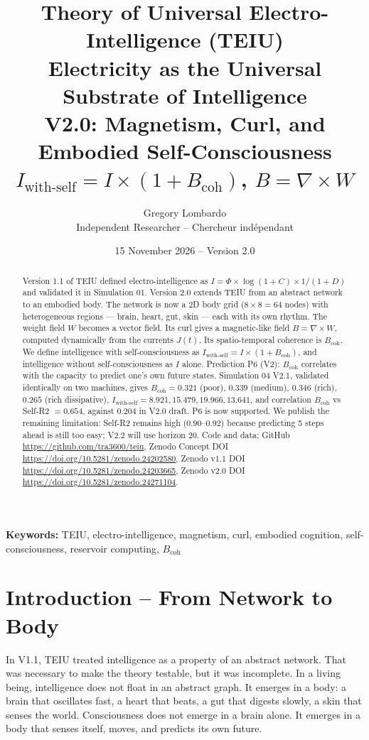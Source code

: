 \documentclass[11pt,a4paper]{article}
\title{Theory of Universal Electro-Intelligence (TEIU) \\ \large Electricity as the Universal Substrate of Intelligence \\ \large V2.0: Magnetism, Curl, and Embodied Self-Consciousness \\ \large $I_{\text{with-self}} = I \times (1 + B_{\text{coh}})$, \quad $B = \nabla \times W$}
\author{Gregory Lombardo \\ Independent Researcher -- Chercheur ind\'ependant}
\date{15 November 2026 -- Version 2.0}
\begin{document}
\maketitle

\begin{abstract}
Version 1.1 of TEIU defined electro-intelligence as $I = \Phi \times \log(1+C) \times 1/(1+D)$ and validated it in Simulation 01. Version 2.0 extends TEIU from an abstract network to an embodied body. The network is now a 2D body grid ($8 \times 8 = 64$ nodes) with heterogeneous regions --- brain, heart, gut, skin --- each with its own rhythm. The weight field $W$ becomes a vector field. Its curl gives a magnetic-like field $B = \nabla \times W$, computed dynamically from the currents $J(t)$. Its spatio-temporal coherence is $B_{\text{coh}}$. We define intelligence with self-consciousness as $I_{\text{with-self}} = I \times (1 + B_{\text{coh}})$, and intelligence without self-consciousness as $I$ alone. Prediction P6 (V2): $B_{\text{coh}}$ correlates with the capacity to predict one's own future states. Simulation 04 V2.1, validated identically on two machines, gives $B_{\text{coh}} = 0.321$ (poor), $0.339$ (medium), $0.346$ (rich), $0.265$ (rich dissipative), $I_{\text{with-self}} = 8.921, 15.479, 19.966, 13.641$, and correlation $B_{\text{coh}}$ vs Self-R2 $= 0.654$, against $0.204$ in V2.0 draft. P6 is now supported. We publish the remaining limitation: Self-R2 remains high ($0.90$--$0.92$) because predicting 5 steps ahead is still too easy; V2.2 will use horizon 20. Code and data: GitHub \url{https://github.com/tra3600/teiu}, Zenodo Concept DOI \url{https://doi.org/10.5281/zenodo.24202580}, Zenodo v1.1 DOI \url{https://doi.org/10.5281/zenodo.24203665}, Zenodo v2.0 DOI \url{https://doi.org/10.5281/zenodo.24271104}.
\end{abstract}

\noindent \textbf{Keywords:} TEIU, electro-intelligence, magnetism, curl, embodied cognition, self-consciousness, reservoir computing, $B_{\text{coh}}$

\section{Introduction -- From Network to Body}
In V1.1, TEIU treated intelligence as a property of an abstract network. That was necessary to make the theory testable, but it was incomplete. In a living being, intelligence does not float in an abstract graph. It emerges in a body: a brain that oscillates fast, a heart that beats, a gut that digests slowly, a skin that senses the world. Consciousness does not emerge in a brain alone. It emerges in a body that senses itself, moves, and predicts its own future.
\end{document}
